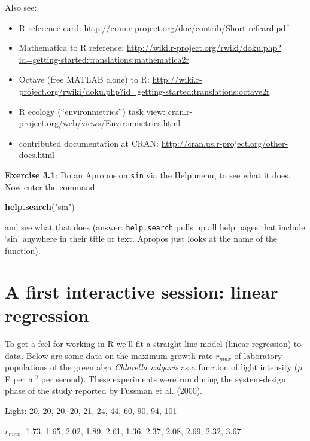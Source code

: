 \documentclass[11pt,]{article}
\newenvironment{Shaded}{\begin{snugshade}}{\end{snugshade}}
\newcommand{\KeywordTok}[1]{\textcolor[rgb]{0.13,0.29,0.53}{\textbf{#1}}}
\newcommand{\StringTok}[1]{\textcolor[rgb]{0.31,0.60,0.02}{#1}}
\newcommand{\NormalTok}[1]{#1}
\begin{document}
Also see:

\begin{itemize}
\item
  R reference card:
  \url{http://cran.r-project.org/doc/contrib/Short-refcard.pdf}
\item
  Mathematica to R reference:
  \url{http://wiki.r-project.org/rwiki/doku.php?id=getting-started:translations:mathematica2r}
\item
  Octave (free MATLAB clone) to R:
  \url{http://wiki.r-project.org/rwiki/doku.php?id=getting-started:translations:octave2r}
\item
  R ecology (``environmetrics'') task view:
  cran.r-project.org/web/views/Environmetrics.html
\item
  contributed documentation at CRAN:
  \url{http://cran.us.r-project.org/other-docs.html}
\end{itemize}

\textbf{Exercise 3.1}: Do an Apropos on \texttt{sin} via the Help menu,
to see what it does. Now enter the command

\begin{Shaded}
\begin{Highlighting}[]
\KeywordTok{help.search}\NormalTok{(}\StringTok{"sin"}\NormalTok{)}
\end{Highlighting}
\end{Shaded}

and see what that does (answer: \texttt{help.search} pulls up all help
pages that include `sin' anywhere in their title or text. Apropos just
looks at the name of the function).

\section{A first interactive session: linear
regression}\label{a-first-interactive-session-linear-regression}

To get a feel for working in R we'll fit a straight-line model (linear
regression) to data. Below are some data on the maximum growth rate
\(r_{max}\) of laboratory populations of the green alga \emph{Chlorella
vulgaris} as a function of light intensity (\(\mu\)E per m\(^2\) per
second). These experiments were run during the system-design phase of
the study reported by Fussman et al. (2000).

Light: 20, 20, 20, 20, 21, 24, 44, 60, 90, 94, 101

\(r_{max}\): 1.73, 1.65, 2.02, 1.89, 2.61, 1.36, 2.37, 2.08, 2.69, 2.32,
3.67
\end{document}
